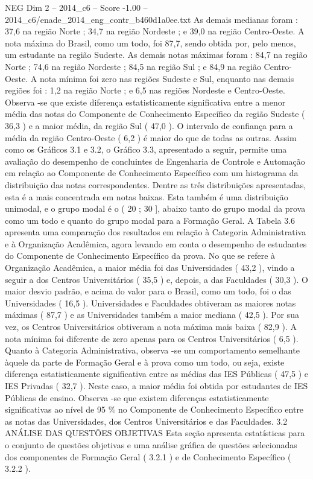 \begin{textsample}{NEG Dim 2 – 2014\_c6 – Score -1.00 – 2014\_c6/enade\_2014\_eng\_contr\_b460d1a0ee.txt}
As demais medianas foram : 37,6 na região Norte ; 34,7 na região Nordeste ; e 39,0 na região Centro-Oeste.
A nota máxima do Brasil, como um todo, foi 87,7, sendo obtida por, pelo menos, um estudante na região Sudeste.
As demais notas máximas foram : 84,7 na região Norte ; 74,6 na região Nordeste ; 84,5 na região Sul ; e 84,9 na região Centro-Oeste.
A nota mínima foi zero nas regiões Sudeste e Sul, enquanto nas demais regiões foi : 1,2 na região Norte ; e 6,5 nas regiões Nordeste e Centro-Oeste.
Observa -se que existe diferença estatisticamente significativa entre a menor média das notas do Componente de Conhecimento Específico da região Sudeste ( 36,3 ) e a maior média, da região Sul ( 47,0 ).
O intervalo de confiança para a média da região Centro-Oeste ( 6,2 ) é maior do que de todas as outras.
Assim como os Gráficos 3.1 e 3.2, o Gráfico 3.3, apresentado a seguir, permite uma avaliação do desempenho de concluintes de Engenharia de Controle e Automação em relação ao Componente de Conhecimento Específico com um histograma da distribuição das notas correspondentes.
Dentre as três distribuições apresentadas, esta é a mais concentrada em notas baixas.
Esta também é uma distribuição unimodal, e o grupo modal é o ( 20 ; 30 ], abaixo tanto do grupo modal da prova como um todo e quanto do grupo modal para a Formação Geral.
A Tabela 3.6 apresenta uma comparação dos resultados em relação à Categoria Administrativa e à Organização Acadêmica, agora levando em conta o desempenho de estudantes do Componente de Conhecimento Específico da prova.
No que se refere à Organização Acadêmica, a maior média foi das Universidades ( 43,2 ), vindo a seguir a dos Centros Universitários ( 35,5 ) e, depois, a das Faculdades ( 30,3 ).
O maior desvio padrão, e acima do valor para o Brasil, como um todo, foi o das Universidades ( 16,5 ).
Universidades e Faculdades obtiveram as maiores notas máximas ( 87,7 ) e as Universidades também a maior mediana ( 42,5 ).
Por sua vez, os Centros Universitários obtiveram a nota máxima mais baixa ( 82,9 ).
A nota mínima foi diferente de zero apenas para os Centros Universitários ( 6,5 ).
Quanto à Categoria Administrativa, observa -se um comportamento semelhante àquele da parte de Formação Geral e à prova como um todo, ou seja, existe diferença estatisticamente significativa entre as médias das IES Públicas ( 47,5 ) e IES Privadas ( 32,7 ).
Neste caso, a maior média foi obtida por estudantes de IES Públicas de ensino.
Observa -se que existem diferenças estatisticamente significativas ao nível de 95 \% no Componente de Conhecimento Específico entre as notas das Universidades, dos Centros Universitários e das Faculdades. 3.2 ANÁLISE DAS QUESTÕES OBJETIVAS Esta seção apresenta estatísticas para o conjunto de questões objetivas e uma análise gráfica de questões selecionadas dos componentes de Formação Geral ( 3.2.1 ) e de Conhecimento Específico ( 3.2.2 ).

\end{textsample}
